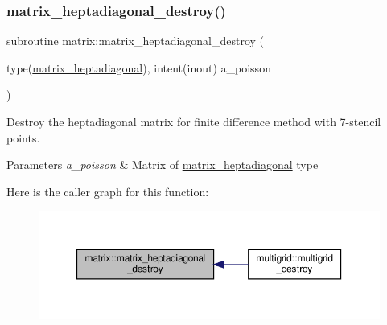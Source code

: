\subsubsection{\texorpdfstring{matrix\+\_\+heptadiagonal\+\_\+destroy()}{matrix\_heptadiagonal\_destroy()}}
{\footnotesize\ttfamily subroutine matrix\+::matrix\+\_\+heptadiagonal\+\_\+destroy (\begin{DoxyParamCaption}\item[{type(\hyperlink{structmatrix_1_1matrix__heptadiagonal}{matrix\+\_\+heptadiagonal}), intent(inout)}]{a\+\_\+poisson }\end{DoxyParamCaption})}



Destroy the heptadiagonal matrix for finite difference method with 7-\/stencil points. 


\begin{DoxyParams}{Parameters}
{\em a\+\_\+poisson} & Matrix of \hyperlink{structmatrix_1_1matrix__heptadiagonal}{matrix\+\_\+heptadiagonal} type \\
\hline
\end{DoxyParams}
Here is the caller graph for this function\+:
\nopagebreak
\begin{figure}[H]
\begin{center}
\leavevmode
\includegraphics[width=350pt]{namespacematrix_a1c201958a669deaddeb6aa76251b394f_icgraph}
\end{center}
\end{figure}
